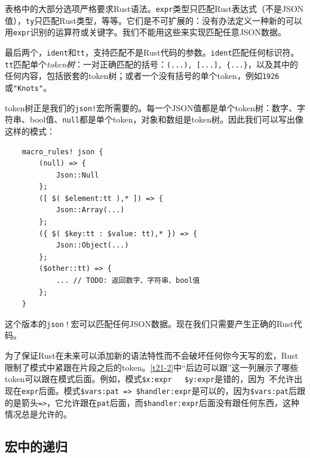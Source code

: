 表格中的大部分选项严格要求Rust语法。\texttt{expr}类型只匹配Rust表达式（不是JSON值），\texttt{ty}只匹配Rust类型，等等。它们是不可扩展的：没有办法定义一种新的可以用\texttt{expr}识别的运算符或关键字。我们不能用这些来实现匹配任意JSON数据。

最后两个，\texttt{ident}和\texttt{tt}，支持匹配不是Rust代码的参数。\texttt{ident}匹配任何标识符。\texttt{tt}匹配单个\emph{token树}：一对正确匹配的括号：\texttt{(...), [...], \{...\}}，以及其中的任何内容，包括嵌套的token树；或者一个没有括号的单个token，例如\texttt{1926}或\texttt{"Knots"}。

token树正是我们的\texttt{json!}宏所需要的。每一个JSON值都是单个token树：数字、字符串、bool值、\texttt{null}都是单个token，对象和数组是token树。因此我们可以写出像这样的模式：
\begin{verbatim}
    macro_rules! json {
        (null) => {
            Json::Null
        };
        ([ $( $element:tt ),* ]) => {
            Json::Array(...)
        };
        ({ $( $key:tt : $value: tt),* }) => {
            Json::Object(...)
        };
        ($other::tt) => {
            ... // TODO: 返回数字、字符串、bool值
        };
    }
\end{verbatim}

这个版本的\texttt{json！}宏可以匹配任何JSON数据。现在我们只需要产生正确的Rust代码。

为了保证Rust在未来可以添加新的语法特性而不会破坏任何你今天写的宏，Rust限制了模式中紧跟在片段之后的token。\autoref{t21-2}中“后边可以跟”这一列展示了哪些token可以跟在模式后面。例如，模式\texttt{\$x:expr ~ \$y:expr}是错的，因为\texttt{~}不允许出现在\texttt{expr}后面。模式\texttt{\$vars:pat => \$handler:expr}是可以的，因为\texttt{\$vars:pat}后跟的是箭头\texttt{=>}，它允许跟在\texttt{pat}后面，而\texttt{\$handler:expr}后面没有跟任何东西，这种情况总是允许的。

\subsection{宏中的递归}
